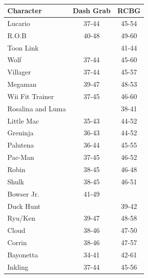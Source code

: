 \begin{table}[h]
\begin{subtable}[t]{.45\linewidth}
\begin{threeparttable}
\begin{tablenotes}
        \end{tablenotes}
        \end{threeparttable}
    \end{subtable}
    \begin{subtable}[t]{.45\linewidth}
        \centering
        \caption{}
        \begin{threeparttable}
        \begin{tabular}{lcc}
            \toprule
            \textbf{Character} & \textbf{Dash Grab} & \textbf{RCBG} \\
            \midrule
            Lucario           & 37-44          & 45-54 \\
            R.O.B             & 40-48\tnote{1} & 49-60\tnote{3} \\
            Toon Link         &                & 41-44 \\
            Wolf              & 37-44          & 45-60 \\
            Villager          & 37-44          & 45-57 \\
            Megaman           & 39-47          & 48-53 \\
            Wii Fit Trainer   & 37-45          & 46-60 \\
            Rosalina and Luma &                & 38-41\tnote{5} \\
            Little Mac        & 35-43\tnote{1} & 44-52 \\
            Greninja          & 36-43          & 44-52 \\
            Palutena          & 36-44          & 45-55 \\
            Pac-Man           & 37-45          & 46-52 \\
            Robin             & 38-45          & 46-48 \\
            Shulk             & 38-45\tnote{2} & 46-51\tnote{2} \\
            Bowser Jr.        & 41-49          &       \\
            Duck Hunt         &                & 39-42\tnote{4} \\
            Ryu/Ken           & 39-47\tnote{1} & 48-58 \\
            Cloud             & 38-46  & 47-50 \\
            Corrin            & 38-46  & 47-57 \\
            Bayonetta         & 34-41  & 42-61 \\
            Inkling           & 37-44  & 45-56 \\

\end{tabular}
\end{threeparttable}
\end{subtable}
\end{table}
